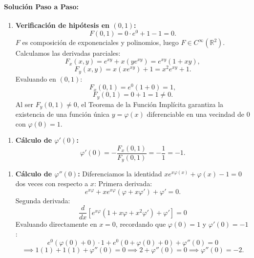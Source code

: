 \documentclass[11pt,a4paper]{article}
\begin{document}
\paragraph{Solución Paso a Paso:}\par
\begin{enumerate}[label=\textbf{\arabic*.}]
\item \textbf{Verificación de hipótesis en $(0,1)$:}
\begin{equation*}
F(0,1) = 0\cdot e^0 + 1 - 1 = 0.
\end{equation*}
$F$ es composición de exponenciales y polinomios, luego $F \in C^\infty(\mathbb{R}^2)$.
Calculamos las derivadas parciales:
\begin{equation*}
F_x(x,y) = e^{xy} + x(y e^{xy}) = e^{xy}(1 + xy),
\end{equation*}
\begin{equation*}
F_y(x,y) = x(x e^{xy}) + 1 = x^2 e^{xy} + 1.
\end{equation*}
Evaluando en $(0,1)$:
\begin{equation*}
F_x(0,1) = e^0(1 + 0) = 1,
\end{equation*}
\begin{equation*}
F_y(0,1) = 0 + 1 = 1 \neq 0.
\end{equation*}
Al ser $F_y(0,1) \neq 0$, el Teorema de la Función Implícita garantiza la existencia de una función única $y = \varphi(x)$ diferenciable en una vecindad de $0$ con $\varphi(0) = 1$.
\end{enumerate}

\begin{enumerate}[label=\textbf{\arabic*.}]
\item \textbf{Cálculo de $\varphi'(0)$:}
\begin{equation*}
\varphi'(0) = -\frac{F_x(0,1)}{F_y(0,1)} = -\frac{1}{1} = -1.
\end{equation*}
\end{enumerate}

\begin{enumerate}[label=\textbf{\arabic*.}]
\item \textbf{Cálculo de $\varphi''(0)$:}
Diferenciamos la identidad $x e^{x\varphi(x)} + \varphi(x) - 1 = 0$ dos veces con respecto a $x$:
Primera derivada:
\begin{equation*}
e^{x\varphi} + x e^{x\varphi}(\varphi + x\varphi') + \varphi' = 0.
\end{equation*}
Segunda derivada:
\begin{equation*}
\frac{d}{dx}\left[e^{x\varphi}(1 + x\varphi + x^2\varphi') + \varphi'\right] = 0
\end{equation*}
Evaluando directamente en $x=0$, recordando que $\varphi(0) = 1$ y $\varphi'(0) = -1$:
\begin{equation*}
e^0 (\varphi(0) + 0) \cdot 1 + e^0 (0 + \varphi(0) + 0) + \varphi''(0) = 0
\end{equation*}
\begin{equation*}
\implies 1(1) + 1(1) + \varphi''(0) = 0 \implies 2 + \varphi''(0) = 0 \implies \varphi''(0) = -2.
\end{equation*}
\end{enumerate}
\end{document}
